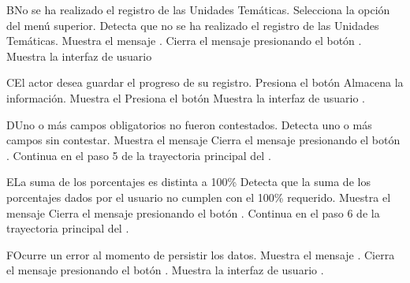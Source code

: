 
\begin{UCtrayectoriaA}{B}{No se ha realizado el registro de las Unidades Temáticas.}
    \UCpaso[\UCactor] Selecciona la opción  del menú superior.
    \UCpaso Detecta que no se ha realizado el registro de las Unidades Temáticas.
        \UCpaso Muestra el mensaje .
    \UCpaso[\UCactor] Cierra el mensaje presionando el botón .
    \UCpaso Muestra la interfaz de usuario 
\end{UCtrayectoriaA}


\begin{UCtrayectoriaA}{C}{El actor desea guardar el progreso de su registro.}
\UCpaso[\UCactor] Presiona el botón 
\UCpaso Almacena la información.
\UCpaso Muestra el 
\UCpaso[\UCactor] Presiona el botón  
\UCpaso Muestra la interfaz de usuario .
\end{UCtrayectoriaA}


\begin{UCtrayectoriaA}{D}{Uno o más campos obligatorios no fueron contestados.}
	\UCpaso Detecta uno o más campos sin contestar.
    \UCpaso Muestra el mensaje 
    \UCpaso[\UCactor] Cierra el mensaje presionando el botón .
    \UCpaso Continua en el paso 5 de la trayectoria principal del .
\end{UCtrayectoriaA}



\begin{UCtrayectoriaA}{E}{La suma de los porcentajes es distinta a 100\%}
    \UCpaso Detecta que la suma de los porcentajes dados por el usuario no cumplen con el 100\% requerido.
    \UCpaso Muestra el mensaje 
    \UCpaso[\UCactor] Cierra el mensaje presionando el botón .
    \UCpaso Continua en el paso 6 de la trayectoria principal del .
\end{UCtrayectoriaA}


\begin{UCtrayectoriaA}{F}{Ocurre un error al momento de persistir los datos.}
	\UCpaso Muestra el mensaje .
	\UCpaso[\UCactor] Cierra el mensaje presionando el botón .
	\UCpaso Muestra la interfaz de usuario .
\end{UCtrayectoriaA}